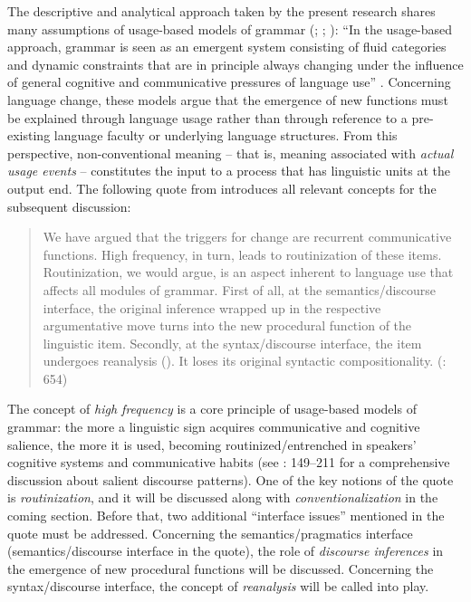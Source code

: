 The descriptive and analytical approach taken by the present research shares many assumptions of usage-based models of grammar (\citealt{Hopper1987}; \citealt{Bybee2007,Bybee2010}; \citealt{Harder2012}): “In the usage-based approach, grammar is seen as an emergent system consisting of fluid categories and dynamic constraints that are in principle always changing under the influence of general cognitive and communicative pressures of language use” \citep[830]{Diessel2011}. Concerning language change, these models argue that the emergence of new functions must be explained through language usage rather than through reference to a pre-existing language faculty or underlying language structures. From this perspective, non-conventional meaning – that is, meaning associated with \textit{actual usage events} – constitutes the input to a process that has linguistic units at the output end. The following quote from \citet{DetgesWaltereit2016} introduces all relevant concepts for the subsequent discussion:

\begin{quote}
We have argued that the triggers for change are recurrent communicative functions. High frequency, in turn, leads to routinization of these items. Routinization, we would argue, is an aspect inherent to language use that affects all modules of grammar. First of all, at the semantics/discourse interface, the original inference wrapped up in the respective argumentative move turns into the new procedural function of the linguistic item. Secondly, at the syntax/discourse interface, the item undergoes reanalysis (\citealt{DetgesWaltereit2002}). It loses its original syntactic compositionality. (\citealt{DetgesWaltereit2016}: 654)
\end{quote}

\hspace*{-2pt}The concept of \textit{high frequency} is a core principle of usage-based models of grammar: the more a linguistic sign acquires communicative and cognitive sa\-lience, the more it is used, becoming routinized/entrenched in speakers’ cognitive systems and communicative habits (see \citealt{Ariel2008}: 149–211 for a comprehensive discussion about salient discourse patterns). One of the key notions of the quote is \textit{routinization}, and it will be discussed along with \textit{conventionalization} in the coming section. Before that, two additional “interface issues” mentioned in the quote must be addressed. Concerning the semantics/pragmatics interface (semantics/discourse interface in the quote), the role of \textit{discourse inferences} in the emergence of new procedural functions will be discussed. Concerning the syntax/discourse interface, the concept of \textit{reanalysis} will be called into play.

